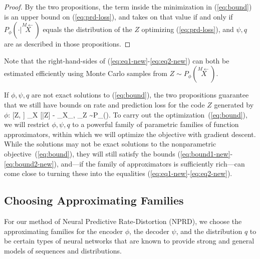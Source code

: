 \documentclass[entropy,article,submit,moreauthors,pdftex,10pt,a4paper]{Definitions/mdpi}
\newcommand{\finitefuture}{\stackrel{\rightarrow \scriptscriptstyle{M}}{X}}
\newcommand{\finitepast}{\stackrel{\scriptscriptstyle{M}\leftarrow}{X}}%
\let\oldequation\equation
\let\oldendequation\endequation
\renewenvironment{equation}
  {\linenomathNonumbers\oldequation}
  {\oldendequation\endlinenomath}
\begin{document}
\begin{proof}
By the two propositions, the term inside the minimization in (\ref{eq:bound}) is an upper bound on (\ref{eq:prd-loss}), and takes on that value if and only if $P_\phi(\cdot|\finitepast)$ equals the distribution of the $Z$ optimizing (\ref{eq:prd-loss}), and $\psi, q$ are as described in those propositions.
\end{proof}

Note that the right-hand-sides of (\ref{eq:eq1-new}-\ref{eq:eq2-new}) can both be estimated efficiently using Monte Carlo samples from $Z \sim P_\phi(\finitepast)$.

If $\phi, \psi, q$ are not exact solutions to (\ref{eq:bound}), the two propositions guarantee that we still have bounds on rate and prediction loss for the code $Z$ generated by $\phi$:
\begin{equation}\label{eq:bound1-new}
 [Z, \finitepast] \leq   {}_{X}\left[ \operatorname{D_{KL}}\infdivx{P_\phi(Z|\finitepast)}{q(Z)}\right]
\end{equation}
\begin{equation}\label{eq:bound2-new}
  [\finitefuture|Z] \leq   - _{X_{\finitepast, \finitefuture}}	_{Z \sim P_\phi(\finitepast)}\left[\log P_\psi(\finitefuture | Z)\right]. %
\end{equation}
To carry out the optimization~(\ref{eq:bound}), we will restrict $\phi, \psi, q$ to a powerful family of parametric families of function approximators, within which we will optimize the objective with gradient descent.
While the solutions may not be exact solutions to the nonparametric objective~(\ref{eq:bound}), they will still satisfy the bounds (\ref{eq:bound1-new}-\ref{eq:bound2-new}), and---if the family of approximators is sufficiently rich---can come close to turning these into the equalities (\ref{eq:eq1-new}-\ref{eq:eq2-new}).
 



\subsection{Choosing Approximating Families}
For our method of Neural Predictive Rate-Distortion (NPRD), we choose the approximating families for the encoder $\phi$, the decoder $\psi$, and the distribution $q$ to be certain types of neural networks that are known to provide strong and general models of sequences and distributions.
\end{document}
